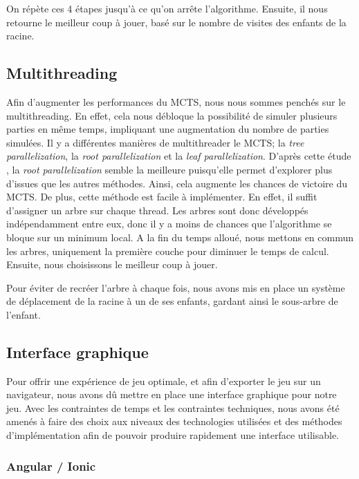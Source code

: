 \documentclass[a4paper,11pt]{article}
\begin{document}
On répète ces 4 étapes jusqu'à ce qu'on arrête l'algorithme. Ensuite, il
nous retourne le meilleur coup à jouer, basé sur le nombre de visites
des enfants de la racine.

\hypertarget{multithreading}{%
\subsection{Multithreading}\label{multithreading}}

Afin d'augmenter les performances du MCTS, nous nous sommes penchés sur
le multithreading. En effet, cela nous débloque la possibilité de
simuler plusieurs parties en même temps, impliquant une augmentation du
nombre de parties simulées. Il y a différentes manières de multithreader
le MCTS; la \emph{tree parallelization}, la \emph{root parallelization}
et la \emph{leaf parallelization}. D'après cette étude
\citep{mass_par_mcts, par_mcts}, la \emph{root parallelization} semble
la meilleure puisqu'elle permet d'explorer plus d'issues que les autres
méthodes. Ainsi, cela augmente les chances de victoire du MCTS. De plus,
cette méthode est facile à implémenter. En effet, il suffit d'assigner
un arbre sur chaque thread. Les arbres sont donc développés
indépendamment entre eux, donc il y a moins de chances que l'algorithme
se bloque sur un minimum local. A la fin du temps alloué, nous mettons
en commun les arbres, uniquement la première couche pour diminuer le
temps de calcul. Ensuite, nous choisissons le meilleur coup à jouer.

Pour éviter de recréer l'arbre à chaque fois, nous avons mis en place un
système de déplacement de la racine à un de ses enfants, gardant ainsi
le sous-arbre de l'enfant.

\hypertarget{interface-graphique}{%
\subsection{Interface graphique}\label{interface-graphique}}

Pour offrir une expérience de jeu optimale, et afin d'exporter le jeu
sur un navigateur, nous avons dû mettre en place une interface graphique
pour notre jeu. Avec les contraintes de temps et les contraintes
techniques, nous avons été amenés à faire des choix aux niveaux des
technologies utilisées et des méthodes d'implémentation afin de pouvoir
produire rapidement une interface utilisable.

\hypertarget{angular-ionic}{%
\subsubsection{Angular / Ionic}\label{angular-ionic}}
\end{document}
